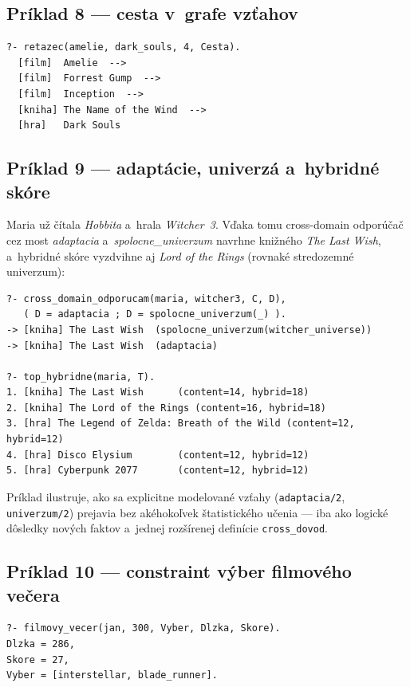 \documentclass[11pt,a4paper]{article}
\begin{document}
\subsection{Príklad 8 --- cesta v~grafe vzťahov}

\begin{lstlisting}[numbers=none]
?- retazec(amelie, dark_souls, 4, Cesta).
  [film]  Amelie  -->
  [film]  Forrest Gump  -->
  [film]  Inception  -->
  [kniha] The Name of the Wind  -->
  [hra]   Dark Souls
\end{lstlisting}

\subsection{Príklad 9 --- adaptácie, univerzá a~hybridné skóre}

Maria už čítala \emph{Hobbita} a~hrala \emph{Witcher~3}. Vďaka
tomu cross-domain odporúčač cez most \emph{adaptacia}
a~\emph{spolocne\_univerzum} navrhne knižného \emph{The Last
Wish}, a~hybridné skóre vyzdvihne aj \emph{Lord of the Rings}
(rovnaké stredozemné univerzum):

\begin{lstlisting}[numbers=none]
?- cross_domain_odporucam(maria, witcher3, C, D),
   ( D = adaptacia ; D = spolocne_univerzum(_) ).
-> [kniha] The Last Wish  (spolocne_univerzum(witcher_universe))
-> [kniha] The Last Wish  (adaptacia)

?- top_hybridne(maria, T).
1. [kniha] The Last Wish      (content=14, hybrid=18)
2. [kniha] The Lord of the Rings (content=16, hybrid=18)
3. [hra] The Legend of Zelda: Breath of the Wild (content=12, hybrid=12)
4. [hra] Disco Elysium        (content=12, hybrid=12)
5. [hra] Cyberpunk 2077       (content=12, hybrid=12)
\end{lstlisting}

\noindent
Príklad ilustruje, ako sa explicitne modelované vzťahy
(\texttt{adaptacia/2}, \texttt{univerzum/2}) prejavia bez
akéhokoľvek štatistického učenia --- iba ako logické dôsledky
nových faktov a~jednej rozšírenej definície \texttt{cross\_dovod}.

\subsection{Príklad 10 --- constraint výber filmového večera}

\begin{lstlisting}[numbers=none]
?- filmovy_vecer(jan, 300, Vyber, Dlzka, Skore).
Dlzka = 286,
Skore = 27,
Vyber = [interstellar, blade_runner].
\end{lstlisting}
\end{document}
